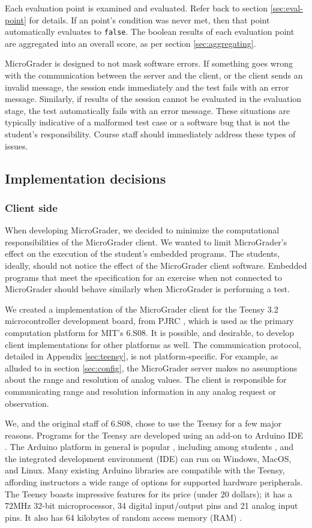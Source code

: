 \documentclass[12pt]{article}
\begin{document}
Each evaluation point is examined and evaluated.  Refer back to section \ref{sec:eval-point} for details.  If an point's condition was never met, then that point automatically evaluates to \texttt{false}.  The boolean results of each evaluation point are aggregated into an overall score, as per section \ref{sec:aggregating}.

MicroGrader is designed to not mask software errors.  If something goes wrong with the communication between the server and the client, or the client sends an invalid message, the session ends immediately and the test fails with an error message.  Similarly, if results of the session cannot be evaluated in the evaluation stage, the test automatically fails with an error message.  These situations are typically indicative of a malformed test case or a software bug that is not the student's responsibility.  Course staff should immediately address these types of issues.


\subsection{Implementation decisions}
\subsubsection{Client side}
When developing MicroGrader, we decided to minimize the computational responsibilities of the MicroGrader client.  We wanted to limit MicroGrader's effect on the execution of the student's embedded programs.  The students, ideally, should not notice the effect of the MicroGrader client software.  Embedded programs that meet the specification for an exercise when not connected to MicroGrader should behave similarly when MicroGrader is performing a test.

We created a implementation of the MicroGrader client for the Teensy 3.2 microcontroller development board, from PJRC \cite{teensy}, which is used as the primary computation platform for MIT's 6.S08.  It is possible, and desirable, to develop client implementations for other platforms as well.  The communication protocol, detailed in Appendix \ref{sec:teensy}, is not platform-specific.  For example, as alluded to in section \ref{sec:config}, the MicroGrader server makes no assumptions about the range and resolution of analog values.  The client is responsible for communicating range and resolution information in any analog request or observation.

We, and the original staff of 6.S08, chose to use the Teensy for a few major reasons.  Programs for the Teensy are developed using an add-on to Arduino IDE \cite{arduino-ide}.  The Arduino platform in general is popular \cite{arduino-popular}, including among students \cite{arduino-students}, and the integrated development environment (IDE) can run on Windows, MacOS, and Linux.  Many existing Arduino libraries are compatible with the Teensy, affording instructors a wide range of options for supported hardware peripherals.  The Teensy boasts impressive features for its price (under 20 dollars); it has a 72MHz 32-bit microprocessor, 34 digital input/output pins and 21 analog input pins.  It also has 64 kilobytes of random access memory (RAM) \cite{teensy-specs}.
\end{document}
